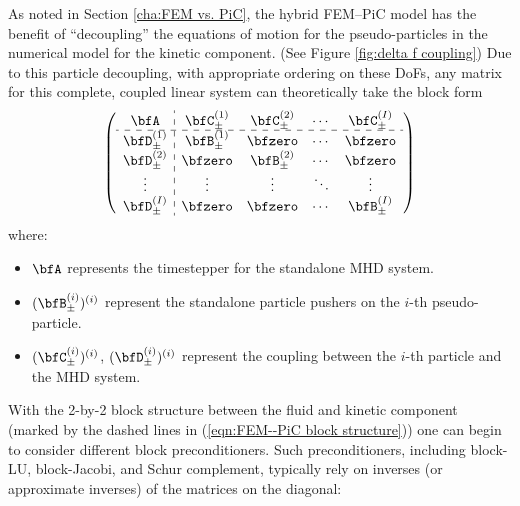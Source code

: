     As noted in Section \ref{cha:FEM vs. PiC}, the hybrid FEM--PiC model has the benefit of ``decoupling'' the equations of motion for the pseudo-particles in the numerical model for the kinetic component. (See Figure \ref{fig:delta f coupling}) Due to this particle decoupling, with appropriate ordering on these DoFs, any matrix for this complete, coupled linear system can theoretically take the block form
    \begin{equation}\label{eqn:FEM--PiC block structure}
        \left(\begin{array}{ c : c c c c }
            \bfA              &  \bfC_{\pm}^{(1)}  &  \bfC_{\pm}^{(2)}  &  \cdots  &  \bfC_{\pm}^{(I)}  \\
            \hdashline
            \bfD_{\pm}^{(1)}  &  \bfB_{\pm}^{(1)}  &  \bfzero           &  \cdots  &  \bfzero           \\
            \bfD_{\pm}^{(2)}  &  \bfzero           &  \bfB_{\pm}^{(2)}  &  \cdots  &  \bfzero           \\
            \vdots            &  \vdots            &  \vdots            &  \ddots  &  \vdots            \\
            \bfD_{\pm}^{(I)}  &  \bfzero           &  \bfzero           &  \cdots  &  \bfB_{\pm}^{(I)}  \\
        \end{array}\right)
    \end{equation}
    where:
    \begin{itemize}
        \item  $\bfA$ represents the timestepper for the standalone MHD system.
        \item  $(\bfB_{\pm}^{(i)})^{(i)}$ represent the standalone particle pushers on the $i$-th pseudo-particle.
        \item  $(\bfC_{\pm}^{(i)})^{(i)}$, $(\bfD_{\pm}^{(i)})^{(i)}$ represent the coupling between the $i$-th particle and the MHD system.
    \end{itemize}
    With the 2-by-2 block structure between the fluid and kinetic component (marked by the dashed lines in (\ref{eqn:FEM--PiC block structure})) one can begin to consider different block preconditioners. Such preconditioners, including block-LU, block-Jacobi, and Schur complement, typically rely on inverses (or approximate inverses) of the matrices on the diagonal:
